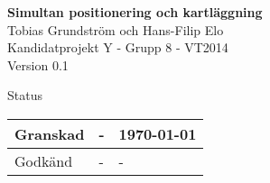 \documentclass[a4paper,12pt,fleqn]{article}
\begin{document}
 
	\pagestyle{fancy} 
	\vspace*{\fill}
\begingroup \begin{center} 
\huge{\textbf{Simultan positionering och
kartläggning}} \\ 
\vspace{10pt} 
\normalsize Tobias Grundström och
Hans-Filip Elo \\ Kandidatprojekt Y - Grupp 8 - VT2014 \\ Version 0.1
\end{center} 
\endgroup 
\vspace*{\fill}

	\begin{center} %
		Status
		\\
		\vspace{3pt} %
	    \begin{tabular}{| p{3cm} | p{3cm} | p{3cm} |} %
	    \hline %
	    Granskad & - & \today \\ \hline %
		Godkänd & - & - \\ \hline %

	    \end{tabular}
	\end{center}
	\vspace{2cm}
	\newpage
%
\end{document}
